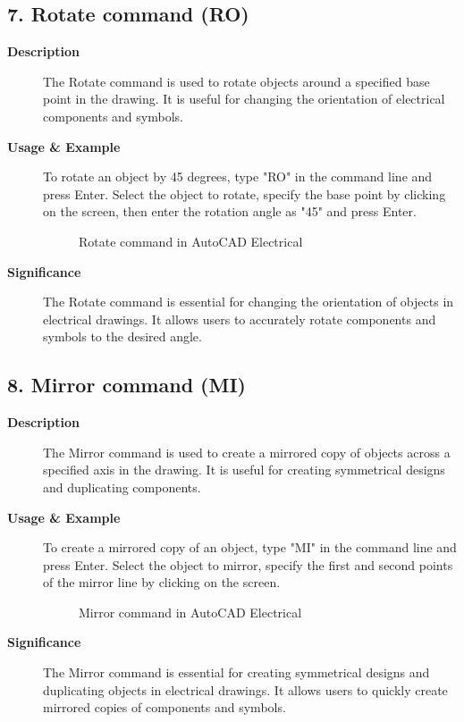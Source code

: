 \documentclass[12pt]{article}
\begin{document}
\subsection*{7. Rotate command (RO)}
\begin{description}
    \item [\textbf{Description}] The Rotate command is used to rotate objects around a specified base point in the drawing. It is useful for changing the orientation of electrical components and symbols.
    \item [\textbf{Usage \& Example}]To rotate an object by 45 degrees, type "RO" in the command line and press Enter. Select the object to rotate, specify the base point by clicking on the screen, then enter the rotation angle as "45" and press Enter.
          \begin{figure}[H]
              \centering
              \caption{Rotate command in AutoCAD Electrical}
          \end{figure}
    \item [\textbf{Significance}] The Rotate command is essential for changing the orientation of objects in electrical drawings. It allows users to accurately rotate components and symbols to the desired angle.
\end{description}

\subsection*{8. Mirror command (MI)}
\begin{description}
    \item [\textbf{Description}] The Mirror command is used to create a mirrored copy of objects across a specified axis in the drawing. It is useful for creating symmetrical designs and duplicating components.
    \item [\textbf{Usage \& Example}]To create a mirrored copy of an object, type "MI" in the command line and press Enter. Select the object to mirror, specify the first and second points of the mirror line by clicking on the screen.
          \begin{figure}[H]
              \centering
              \caption{Mirror command in AutoCAD Electrical}
          \end{figure}
    \item [\textbf{Significance}] The Mirror command is essential for creating symmetrical designs and duplicating objects in electrical drawings. It allows users to quickly create mirrored copies of components and symbols.
\end{description}
\end{document}
